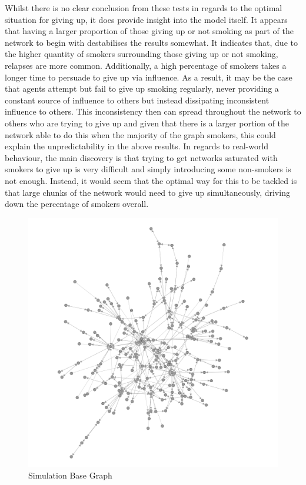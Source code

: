 \documentclass[]{report}
\begin{document}
Whilst there is no clear conclusion from these tests in regards to the optimal situation for giving up, it does provide insight into the model itself. It appears that having a larger proportion of those giving up or not smoking as part of the network to begin with destabilises the results somewhat. It indicates that, due to the higher quantity of smokers surrounding those giving up or not smoking, relapses are more common. Additionally, a high percentage of smokers takes a longer time to persuade to give up via influence. As a result, it may be the case that agents attempt but fail to give up smoking regularly, never providing a constant source of influence to others but instead dissipating inconsistent influence to others. This inconsistency then can spread throughout the network to others who are trying to give up and given that there is a larger portion of the network able to do this when the majority of the graph smokers, this could explain the unpredictability in the above results. In regards to real-world behaviour, the main discovery is that trying to get networks saturated with smokers to give up is very difficult and simply introducing some non-smokers is not enough. Instead, it would seem that the optimal way for this to be tackled is that large chunks of the network would need to give up simultaneously, driving down the percentage of smokers overall.


\begin{figure}
\begin{center}
\includegraphics[scale=0.5]{simbase.png}
\end{center}
\caption{Simulation Base Graph}
\label{img:simbase}
\end{figure}
\end{document}
